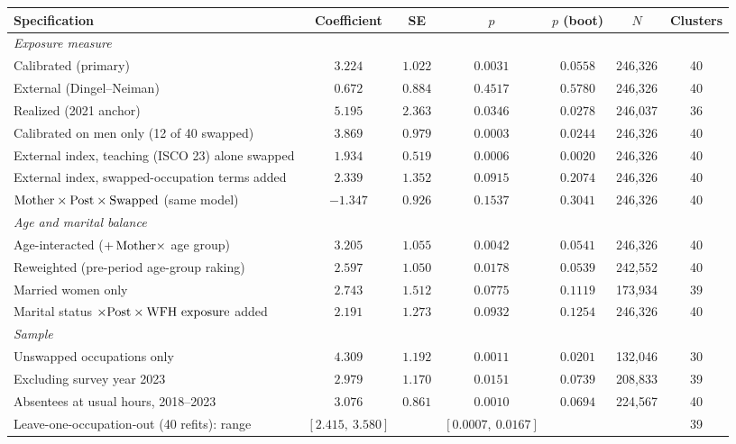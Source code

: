\begin{tabular}{lcccccc}
\toprule
Specification & Coefficient & SE & $p$ & $p$ (boot) & $N$ & Clusters \\
\midrule
\multicolumn{7}{l}{\emph{Exposure measure}} \\
\quad Calibrated (primary) & $3.224$\sym{**} & $1.022$ & $0.0031$ & $0.0558$ & 246{,}326 & 40 \\
\quad External (Dingel--Neiman) & $0.672$ & $0.884$ & $0.4517$ & $0.5780$ & 246{,}326 & 40 \\
\quad Realized (2021 anchor) & $5.195$\sym{*} & $2.363$ & $0.0346$ & $0.0278$ & 246{,}037 & 36 \\
\quad Calibrated on men only (12 of 40 swapped) & $3.869$\sym{***} & $0.979$ & $0.0003$ & $0.0244$ & 246{,}326 & 40 \\
\quad External index, teaching (ISCO 23) alone swapped & $1.934$\sym{***} & $0.519$ & $0.0006$ & $0.0020$ & 246{,}326 & 40 \\
\quad External index, swapped-occupation terms added & $2.339$\sym{\cdot} & $1.352$ & $0.0915$ & $0.2074$ & 246{,}326 & 40 \\
\quad\quad $\text{Mother} \times \text{Post} \times \mathrm{Swapped}$ (same model) & $-1.347$ & $0.926$ & $0.1537$ & $0.3041$ & 246{,}326 & 40 \\
\multicolumn{7}{l}{\emph{Age and marital balance}} \\
\quad Age-interacted ($+\,\text{Mother} \times$ age group) & $3.205$\sym{**} & $1.055$ & $0.0042$ & $0.0541$ & 246{,}326 & 40 \\
\quad Reweighted (pre-period age-group raking) & $2.597$\sym{*} & $1.050$ & $0.0178$ & $0.0539$ & 242{,}552 & 40 \\
\quad Married women only & $2.743$\sym{\cdot} & $1.512$ & $0.0775$ & $0.1119$ & 173{,}934 & 39 \\
\quad Marital status $\times \text{Post} \times \text{WFH exposure}$ added & $2.191$\sym{\cdot} & $1.273$ & $0.0932$ & $0.1254$ & 246{,}326 & 40 \\
\multicolumn{7}{l}{\emph{Sample}} \\
\quad Unswapped occupations only & $4.309$\sym{**} & $1.192$ & $0.0011$ & $0.0201$ & 132{,}046 & 30 \\
\quad Excluding survey year 2023 & $2.979$\sym{*} & $1.170$ & $0.0151$ & $0.0739$ & 208{,}833 & 39 \\
\quad Absentees at usual hours, 2018--2023 & $3.076$\sym{***} & $0.861$ & $0.0010$ & $0.0694$ & 224{,}567 & 40 \\
\quad Leave-one-occupation-out (40 refits): range & $[2.415,\ 3.580]$ &  & $[0.0007,\ 0.0167]$ &  &  & 39 \\

\end{tabular}
